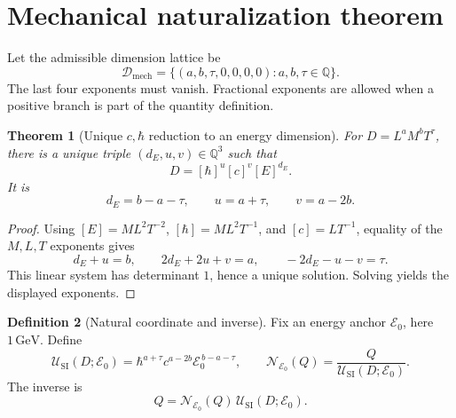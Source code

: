 \documentclass[11pt,a4paper]{article}
\theoremstyle{definition}
\newtheorem{definition}{Definition}[section]
\theoremstyle{plain}
\newtheorem{theorem}[definition]{Theorem}
\theoremstyle{remark}
\newcommand{\Ezero}{\mathcal E_0}
\newcommand{\USI}{\mathcal U_{\mathrm{SI}}}
\newcommand{\Nhep}{\mathcal N_{\Ezero}}
\newcommand{\GeV}{\mathrm{GeV}}
\begin{document}
\begin{center}
\end{center}

\section{Mechanical naturalization theorem}

Let the admissible dimension lattice be
\[
\mathcal D_{\mathrm{mech}}
=\{(a,b,\tau,0,0,0,0):a,b,\tau\in\mathbb Q\}.
\]
The last four exponents must vanish. Fractional exponents are allowed
when a positive branch is part of the quantity definition.

\begin{theorem}[Unique \(c,\hbar\) reduction to an energy dimension]
For \(D=L^aM^bT^\tau\), there is a unique triple
\((d_E,u,v)\in\mathbb Q^3\) such that
\[
 D=[\hbar]^u[c]^v[E]^{d_E}.
\]
It is
\[
 \boxed{d_E=b-a-\tau,\qquad u=a+\tau,\qquad v=a-2b.}
\]
\end{theorem}

\begin{proof}
Using
\([E]=ML^2T^{-2}\), \([\hbar]=ML^2T^{-1}\), and
\([c]=LT^{-1}\), equality of the \(M,L,T\) exponents gives
\[
 d_E+u=b,\qquad
 2d_E+2u+v=a,\qquad
 -2d_E-u-v=\tau.
\]
This linear system has determinant \(1\), hence a unique solution.
Solving yields the displayed exponents.
\end{proof}

\begin{definition}[Natural coordinate and inverse]
Fix an energy anchor \(\Ezero\), here \(1\,\GeV\). Define
\[
\USI(D;\Ezero)=
\hbar^{a+\tau}c^{a-2b}\Ezero^{\,b-a-\tau},
\qquad
\Nhep(Q)=\frac{Q}{\USI(D;\Ezero)}.
\]
The inverse is
\[
Q=\Nhep(Q)\,\USI(D;\Ezero).
\]
\end{definition}
\end{document}

